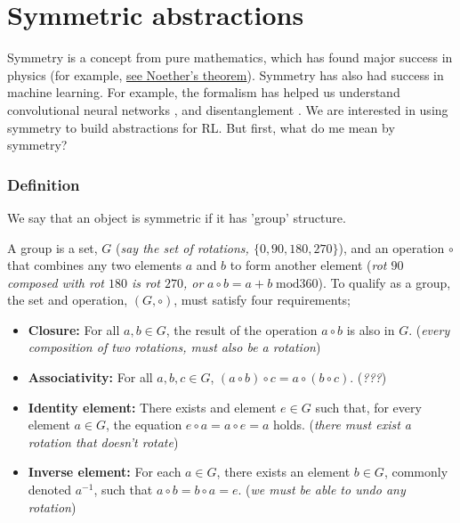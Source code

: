 \newpage
\section{Symmetric abstractions}\label{symmetric-abstractions}

Symmetry is a concept from pure mathematics, which has found major success in physics (for example, \href{https://en.wikipedia.org/wiki/Noether%27s_theorem}{see Noether's theorem}).
Symmetry has also had success in machine learning. For example, the formalism has
helped us understand convolutional neural networks \cite{Cohen2017}, and disentanglement \cite{Higgins2018}.
We are interested in using symmetry to build abstractions for RL. But first, what do me mean by symmetry?




\subsubsection{Definition}

We say that an object is symmetric if it has 'group' structure.

A group is a set, $G$ (\textit{say the set of rotations, $\{0, 90, 180, 270\}$}),
and an operation $\circ$ that combines any two elements $a$ and $b$ to form
another element (\textit{rot $90$ composed with rot $180$ is rot $270$, or} $a \circ b = a + b \;\text{mod} 360$).
To qualify as a group, the set and operation, $(G, \circ)$, must satisfy four requirements;

\begin{itemize}
	\tightlist
	\item \textbf{Closure:} For all $a, b \in G$, the result of the operation $a \circ b$ is also in $G$. (\textit{every composition of two rotations, must also be a rotation})
	\item \textbf{Associativity:} For all $a,b,c \in G$, $(a\circ b) \circ c = a\circ (b\circ c)$. (\textit{???})
	\item \textbf{Identity element:} There exists and element $e\in G$ such that, for every element $a\in G$, the equation $e\circ a = a\circ e = a$ holds. (\textit{there must exist a rotation that doesn't rotate})
	\item \textbf{Inverse element:} For each $a \in G$, there exists an element $b \in G$, commonly denoted $a^{−1}$, such that $a \circ b = b \circ a = e$. (\textit{we must be able to undo any rotation})
\end{itemize}

